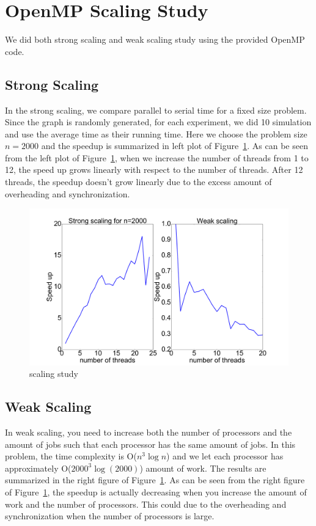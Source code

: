 \documentclass[11pt]{article}
\begin{document}
\section*{OpenMP Scaling Study}
We did both strong scaling and weak scaling study using the provided OpenMP code.

\subsection*{Strong Scaling}
In the strong scaling, we compare parallel to serial time for a fixed size problem. Since the graph is randomly generated, for each experiment, we did 10 simulation and use the average time as their running time. Here we choose the problem size $n=2000$ and the speedup is summarized in left plot of Figure~\ref{scaling}. As can be seen from the left plot of Figure~\ref{scaling}, when we increase the number of threads from 1 to 12, the speed up grows linearly with respect to the number of threads. After 12 threads, the speedup doesn't grow linearly due to the excess amount of overheading and synchronization.

\begin{figure}
\caption{scaling study}
\label{scaling}
\includegraphics[height=0.4\textwidth, width=\textwidth]{scaling.png}
\end{figure}


\subsection*{Weak Scaling}
In weak scaling, you need to increase both the number of processors and the amount of jobs such that each processor has the same amount of jobs. In this problem, the time complexity is O($n^3 \log n$) and we let each processor has approximately O($2000^3\log(2000)$) amount of work. The results are summarized in the right figure of Figure~\ref{scaling}. As can be seen from the right figure of Figure~\ref{scaling}, the speedup is actually decreasing when you increase the amount of work and the number of processors. This could due to the overheading and synchronization when the number of processors is large.
\end{document}
